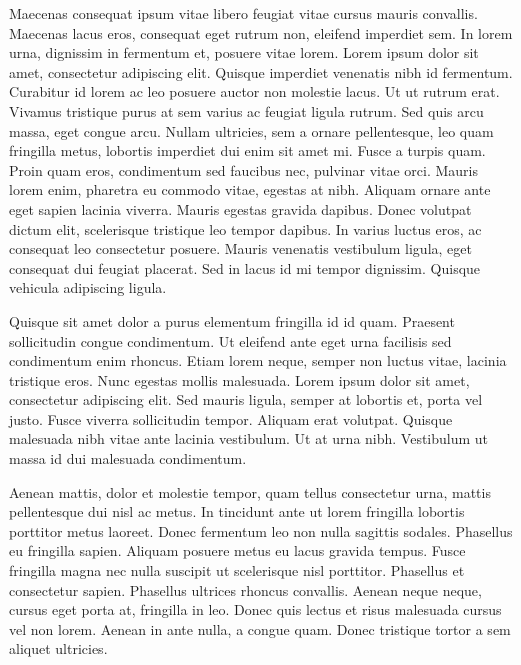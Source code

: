 Maecenas consequat ipsum vitae libero feugiat vitae cursus mauris convallis.
Maecenas lacus eros, consequat eget rutrum non, eleifend imperdiet sem.
In lorem urna, dignissim in fermentum et, posuere vitae lorem.
Lorem ipsum dolor sit amet, consectetur adipiscing elit.
Quisque imperdiet venenatis nibh id fermentum.
Curabitur id lorem ac leo posuere auctor non molestie lacus.
Ut ut rutrum erat.
Vivamus tristique purus at sem varius ac feugiat ligula rutrum.
Sed quis arcu massa, eget congue arcu.
Nullam ultricies, sem a ornare pellentesque, leo quam fringilla metus, lobortis imperdiet dui enim sit amet mi.
Fusce a turpis quam.
Proin quam eros, condimentum sed faucibus nec, pulvinar vitae orci.
Mauris lorem enim, pharetra eu commodo vitae, egestas at nibh.
Aliquam ornare ante eget sapien lacinia viverra.
Mauris egestas gravida dapibus.
Donec volutpat dictum elit, scelerisque tristique leo tempor dapibus.
In varius luctus eros, ac consequat leo consectetur posuere.
Mauris venenatis vestibulum ligula, eget consequat dui feugiat placerat.
Sed in lacus id mi tempor dignissim.
Quisque vehicula adipiscing ligula.

Quisque sit amet dolor a purus elementum fringilla id id quam.
Praesent sollicitudin congue condimentum.
Ut eleifend ante eget urna facilisis sed condimentum enim rhoncus.
Etiam lorem neque, semper non luctus vitae, lacinia tristique eros.
Nunc egestas mollis malesuada.
Lorem ipsum dolor sit amet, consectetur adipiscing elit.
Sed mauris ligula, semper at lobortis et, porta vel justo.
Fusce viverra sollicitudin tempor.
Aliquam erat volutpat.
Quisque malesuada nibh vitae ante lacinia vestibulum.
Ut at urna nibh.
Vestibulum ut massa id dui malesuada condimentum.

Aenean mattis, dolor et molestie tempor, quam tellus consectetur urna, mattis pellentesque dui nisl ac metus.
In tincidunt ante ut lorem fringilla lobortis porttitor metus laoreet.
Donec fermentum leo non nulla sagittis sodales.
Phasellus eu fringilla sapien.
Aliquam posuere metus eu lacus gravida tempus.
Fusce fringilla magna nec nulla suscipit ut scelerisque nisl porttitor.
Phasellus et consectetur sapien.
Phasellus ultrices rhoncus convallis.
Aenean neque neque, cursus eget porta at, fringilla in leo.
Donec quis lectus et risus malesuada cursus vel non lorem.
Aenean in ante nulla, a congue quam.
Donec tristique tortor a sem aliquet ultricies.

